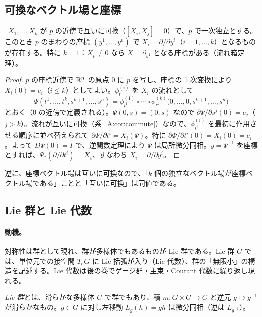 \subsection{可換なベクトル場と座標}\label{A:sub:commute}
\begin{thm}[可換な独立ベクトル場は座標になる]\label{A:thm:commute}
\tP\ $X_1,\dots,X_k$ が $p$ の近傍で互いに可換（$[X_i,X_j]=0$）で、$p$ で一次独立とする。このとき $p$ のまわりの座標 $(y^1,\dots,y^n)$ で $X_i=\partial/\partial y^i$（$i=1,\dots,k$）となるものが存在する。特に $k=1$：$X_p\ne0$ なら $X=\partial_{y^1}$ となる座標がある（流れ箱定理）。
\end{thm}
\begin{proof}
$p$ の座標近傍で $\mathbb R^n$ の原点 $0$ に $p$ を写し、座標の 1 次変換により $X_i(0)=e_i$（$i\le k$）としてよい。$\phi^{(i)}_t$ を $X_i$ の流れとして
\[
\Psi(t^1,\dots,t^k,s^{k+1},\dots,s^n)=\phi^{(1)}_{t^1}\circ\cdots\circ\phi^{(k)}_{t^k}\bigl(0,\dots,0,s^{k+1},\dots,s^n\bigr)
\]
とおく（$0$ の近傍で定義される）。$\Psi(0,s)=(0,s)$ なので $\partial\Psi/\partial s^j(0)=e_j$（$j>k$）。流れが互いに可換（系~\ref{A:cor:commute}）なので、$\phi^{(i)}_{t^i}$ を最初に作用させる順序に並べ替えられて $\partial\Psi/\partial t^i=X_i(\Psi)$。特に $\partial\Psi/\partial t^i(0)=X_i(0)=e_i$。よって $D\Psi(0)=I$ で、逆関数定理により $\Psi$ は局所微分同相。$y=\Psi^{-1}$ を座標とすれば、$\Psi_*(\partial/\partial t^i)=X_i$、すなわち $X_i=\partial/\partial y^i$。
\end{proof}

逆に、座標ベクトル場は互いに可換なので、「$k$ 個の独立なベクトル場が座標ベクトル場である」ことと「互いに可換」は同値である。

\subsection{Lie 群と Lie 代数}\label{A:sub:liegroup}
\paragraph{動機。}対称性は群として現れ、群が多様体でもあるものが Lie 群である。Lie 群 $G$ では、単位元での接空間 $T_eG$ に Lie 括弧が入り（Lie 代数）、群の「無限小」の構造を記述する。Lie 代数は後の巻でゲージ群・主束・Courant 代数に繰り返し現れる。

\begin{defn}
\emph{Lie 群}とは、滑らかな多様体 $G$ で群でもあり、積 $m:G\times G\to G$ と逆元 $g\mapsto g^{-1}$ が滑らかなもの。$g\in G$ に対し左移動 $L_g(h)=gh$ は微分同相（逆は $L_{g^{-1}}$）。
\end{defn}

